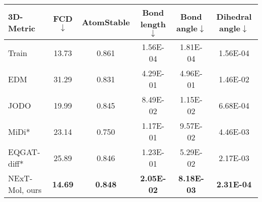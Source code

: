 \begin{tabular}{lccccccccc}
3D-Metric                      & FCD$\downarrow$              & \multicolumn{2}{c}{AtomStable}                                                & \multicolumn{2}{c}{Bond length$\downarrow$}                & \multicolumn{2}{c}{Bond angle$\downarrow$}                & \multicolumn{2}{c}{Dihedral angle$\downarrow$}           \\\midrule
{\color{gray} Train}   & {\color{gray} 13.73} & \multicolumn{2}{c}{{\color{gray} 0.861}}           & \multicolumn{2}{c}{{\color{gray} 1.56E-04}}                  & \multicolumn{2}{c}{{\color{gray} 1.81E-04}}         & \multicolumn{2}{c}{{\color{gray} 1.56E-04}}         \\
EDM                            & 31.29                        & \multicolumn{2}{c}{0.831}                                                         & \multicolumn{2}{c}{4.29E-01}                                         & \multicolumn{2}{c}{4.96E-01}                                & \multicolumn{2}{c}{1.46E-02}                                \\
JODO                           & 19.99                        & \multicolumn{2}{c}{0.845}                                                         & \multicolumn{2}{c}{8.49E-02}                                         & \multicolumn{2}{c}{1.15E-02}                                & \multicolumn{2}{c}{6.68E-04}                                \\
MiDi*                          & 23.14                        & \multicolumn{2}{c}{0.750}                                                         & \multicolumn{2}{c}{1.17E-01}                                         & \multicolumn{2}{c}{9.57E-02}                                & \multicolumn{2}{c}{4.46E-03}                                \\
EQGAT-diff*                          & 25.89                        & \multicolumn{2}{c}{0.846}                                                         & \multicolumn{2}{c}{1.23E-01}                                         & \multicolumn{2}{c}{5.29E-02}                                & \multicolumn{2}{c}{2.17E-03}                                \\
NExT-Mol, ours                 & \textbf{14.69}               & \multicolumn{2}{c}{\textbf{0.848}}                                       & \multicolumn{2}{c}{\textbf{2.05E-02}}                                & \multicolumn{2}{c}{\textbf{8.18E-03}}                       & \multicolumn{2}{c}{\textbf{2.31E-04}}                      \\ \bottomrule
\end{tabular}

